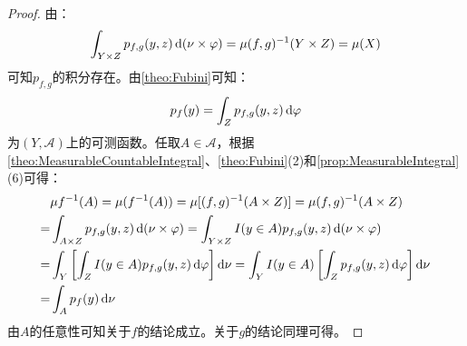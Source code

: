 \begin{proof}
	由：
	\begin{equation*}
		\int_{Y\times Z}p_{f,g}(y,z)\mathop{}\!\mathrm{d}(\nu\times\varphi)=\mu(f,g)^{-1}(Y\times Z)=\mu(X)
	\end{equation*}
	可知$p_{f,g}$的积分存在。由\cref{theo:Fubini}可知：
	\begin{equation*}
		p_f(y)=\int_{Z}p_{f,g}(y,z)\mathop{}\!\mathrm{d}\varphi
	\end{equation*}
	为$(Y,\mathscr{A})$上的可测函数。任取$A\in\mathscr{A}$，根据\cref{theo:MeasurableCountableIntegral}、\cref{theo:Fubini}(2)和\cref{prop:MeasurableIntegral}(6)可得：
	\begin{align*}
		&\mu f^{-1}(A)=\mu(f^{-1}(A))=\mu[(f,g)^{-1}(A\times Z)]=\mu(f,g)^{-1}(A\times Z) \\
		=&\int_{A\times Z}p_{f,g}(y,z)\mathop{}\!\mathrm{d}(\nu\times\varphi)=\int_{Y\times Z}I(y\in A)p_{f,g}(y,z)\mathop{}\!\mathrm{d}(\nu\times\varphi) \\
		=&\int_{Y}\left[\int_{Z}I(y\in A)p_{f,g}(y,z)\mathop{}\!\mathrm{d}\varphi\right]\mathop{}\!\mathrm{d}\nu=\int_{Y}I(y\in A)\left[\int_{Z}p_{f,g}(y,z)\mathop{}\!\mathrm{d}\varphi\right]\mathop{}\!\mathrm{d}\nu \\
		=&\int_{A}p_f(y)\mathop{}\!\mathrm{d}\nu
	\end{align*}
	由$A$的任意性可知关于$f$的结论成立。关于$g$的结论同理可得。
\end{proof}